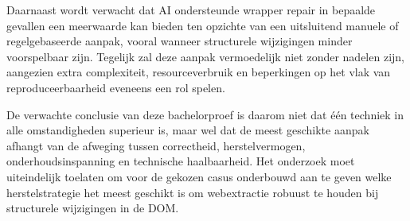 Daarnaast wordt verwacht dat AI ondersteunde wrapper repair in bepaalde gevallen een meerwaarde kan bieden ten opzichte van een uitsluitend manuele of regelgebaseerde aanpak, vooral wanneer structurele wijzigingen minder voorspelbaar zijn. Tegelijk zal deze aanpak vermoedelijk niet zonder nadelen zijn, aangezien extra complexiteit, resourceverbruik en beperkingen op het vlak van reproduceerbaarheid eveneens een rol spelen.

De verwachte conclusie van deze bachelorproef is daarom niet dat één techniek in alle omstandigheden superieur is, maar wel dat de meest geschikte aanpak afhangt van de afweging tussen correctheid, herstelvermogen, onderhoudsinspanning en technische haalbaarheid. Het onderzoek moet uiteindelijk toelaten om voor de gekozen casus onderbouwd aan te geven welke herstelstrategie het meest geschikt is om webextractie robuust te houden bij structurele wijzigingen in de DOM.



\clearpage
\appendix

